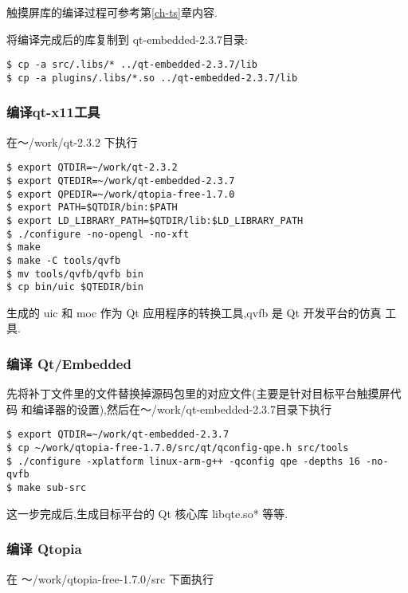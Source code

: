 	触摸屏库的编译过程可参考第\ref{ch-ts}章内容.

	将编译完成后的库复制到 qt-embedded-2.3.7目录:

\begin{boxedminipage}{.9\textwidth}
\begin{verbatim}
$ cp -a src/.libs/* ../qt-embedded-2.3.7/lib
$ cp -a plugins/.libs/*.so ../qt-embedded-2.3.7/lib
\end{verbatim}
\end{boxedminipage}

\subsubsection{编译qt-x11工具}
	在～/work/qt-2.3.2 下执行

\begin{boxedminipage}{.9\textwidth}
\begin{verbatim}
$ export QTDIR=~/work/qt-2.3.2
$ export QTEDIR=~/work/qt-embedded-2.3.7
$ export QPEDIR=~/work/qtopia-free-1.7.0
$ export PATH=$QTDIR/bin:$PATH
$ export LD_LIBRARY_PATH=$QTDIR/lib:$LD_LIBRARY_PATH
$ ./configure -no-opengl -no-xft
$ make
$ make -C tools/qvfb
$ mv tools/qvfb/qvfb bin
$ cp bin/uic $QTEDIR/bin
\end{verbatim}
\end{boxedminipage}

	生成的 uic 和 moc 作为 Qt 应用程序的转换工具,qvfb 是 Qt 开发平台的仿真
工具.

\subsubsection{编译 Qt/Embedded}
	先将补丁文件里的文件替换掉源码包里的对应文件(主要是针对目标平台触摸屏代码
和编译器的设置),然后在～/work/qt-embedded-2.3.7目录下执行

\begin{boxedminipage}{.9\textwidth}
\begin{verbatim} 
$ export QTDIR=~/work/qt-embedded-2.3.7
$ cp ~/work/qtopia-free-1.7.0/src/qt/qconfig-qpe.h src/tools
$ ./configure -xplatform linux-arm-g++ -qconfig qpe -depths 16 -no-qvfb
$ make sub-src
\end{verbatim}
\end{boxedminipage}

	这一步完成后,生成目标平台的 Qt 核心库 libqte.so* 等等.

\subsubsection{编译 Qtopia}
	在 ～/work/qtopia-free-1.7.0/src 下面执行

